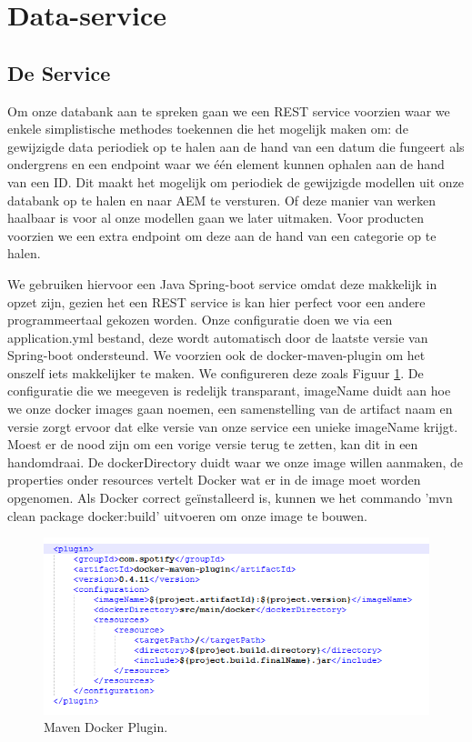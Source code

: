 \documentclass{article}
\begin{document}
	\section{Data-service}
	
	\subsection{De Service}
	Om onze databank aan te spreken gaan we een REST service voorzien waar we enkele simplistische methodes toekennen die het mogelijk maken om: de gewijzigde data periodiek op te halen aan de hand van een datum die fungeert als ondergrens en een endpoint waar we \'e\'en element kunnen ophalen aan de hand van een ID. Dit maakt het mogelijk om periodiek de gewijzigde modellen uit onze databank op te halen en naar AEM te versturen. Of deze manier van werken haalbaar is voor al onze modellen gaan we later uitmaken. Voor producten voorzien we een extra endpoint om deze aan de hand van een categorie op te halen. 
	\par
	We gebruiken hiervoor een Java Spring-boot service omdat deze makkelijk in opzet zijn, gezien het een REST service is kan hier perfect voor een andere programmeertaal gekozen worden. Onze configuratie doen we via een application.yml bestand, deze wordt automatisch door de laatste versie van Spring-boot ondersteund. We voorzien ook de docker-maven-plugin om het onszelf iets makkelijker te maken. We configureren deze zoals Figuur \ref{fig:docker-plugin}. De configuratie die we meegeven is redelijk transparant, imageName duidt aan hoe we onze docker images gaan noemen, een samenstelling van de artifact naam en versie zorgt ervoor dat elke versie van onze service een unieke imageName krijgt. Moest er de nood zijn om een vorige versie terug te zetten, kan dit in een handomdraai. De dockerDirectory duidt waar we onze image willen aanmaken, de properties onder resources vertelt Docker wat er in de image moet worden opgenomen. Als Docker correct ge\"installeerd is, kunnen we het commando 'mvn clean package docker:build' uitvoeren om onze image te bouwen.
	
	\begin{figure}[h!]
		\centering
  		\includegraphics[width=\linewidth]{images/maven-plugin.PNG}
  		\caption{Maven Docker Plugin.}
  		\label{fig:docker-plugin}
	\end{figure}
\end{document}
